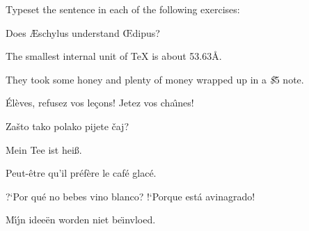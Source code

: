 
 
Typeset the sentence in each of the following exercises: 
 
\exercise Does \AE schylus understand \OE dipus? 
 
\exercise The smallest internal unit of \TeX{} is about 53.63\AA. 
 
\exercise They took some honey and plenty of money wrapped up in a 
{\it \$}5 note. 
 
\exercise \'El\`eves, refusez vos le\c cons! Jetez vos cha\^\i nes! 
 
\exercise Za\v sto tako polako pijete \v caj? 
 
\exercise Mein Tee ist hei\ss. 
 
\exercise Peut-\^etre qu'il pr\'ef\`ere le caf\'e glac\'e. 
 
\exercise ?`Por qu\'e no bebes vino blanco? !`Porque est\'a avinagrado! 
 
\exercise M\'\i\'\j n idee\"en worden niet be\"\i nvloed. 
 
